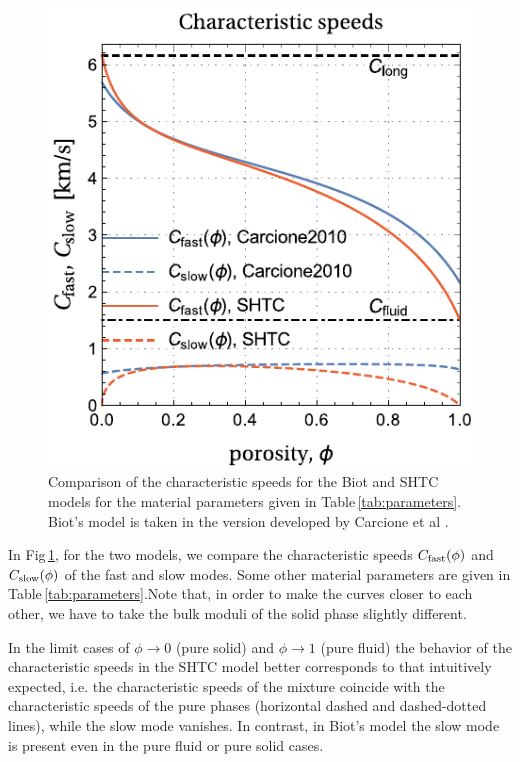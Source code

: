 \documentclass[3p,times,table]{article}
\begin{document}
\begin{figure}[!htbp]
	\begin{center}
		\includegraphics[draft=false,trim=0 -5 0 0,clip, 
		scale=0.75]{Figures/Characteristics}
		\caption{Comparison of the characteristic speeds for the Biot and SHTC 
		models for the material parameters given in 
		Table\,\ref{tab:parameters}. Biot's model is taken in the version developed by 
		Carcione et al \cite{Carcione2010}.  
				}  
		\label{fig:diff.grain.modulus}
	\end{center}
\end{figure}


In Fig\,\ref{fig:diff.grain.modulus}, for the two models, we compare the 
characteristic speeds $ C_{\rm fast}(\phi) $ and $ C_{\rm 
slow}(\phi) $ of the fast 
and slow modes. Some other material parameters 
are given in Table\,\ref{tab:parameters}.Note that, in order to make the 
curves closer to each other, we have to take the bulk moduli of the solid 
phase slightly different. 

In the limit cases 
of $ \phi \to 0 $ (pure solid) and $ \phi \to 1 $ (pure fluid) the behavior of 
the characteristic speeds in the SHTC model better corresponds to that 
intuitively 
expected, i.e. the characteristic speeds of the mixture coincide with the 
characteristic speeds of the pure phases (horizontal dashed and dashed-dotted 
lines), while the slow mode vanishes. In 
contrast, in Biot's model the slow mode is present even in the pure fluid or 
pure solid cases. 
\end{document}

